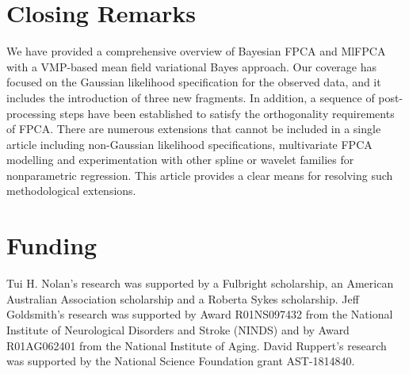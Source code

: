\documentclass[ba]{imsart}
\numberwithin{equation}{section}
\theoremstyle{plain}
\begin{document}

\section{Closing Remarks}
\label{sec:closing_remarks}

We have provided a comprehensive overview of Bayesian FPCA and MlFPCA with a VMP-based mean
field variational Bayes approach. Our coverage has focused on the Gaussian likelihood specification for the observed data,
and it includes the introduction of three new fragments. In addition, a sequence of post-processing steps have
been established to satisfy the orthogonality requirements of FPCA. There are numerous extensions that cannot be included
in a single article including non-Gaussian likelihood specifications, multivariate FPCA modelling and experimentation with
other spline or wavelet families for nonparametric regression. This article provides a clear means for resolving such
methodological extensions.


\section*{Funding}

Tui H. Nolan's research was supported by a Fulbright scholarship, an American Australian Association
scholarship and a Roberta Sykes scholarship. Jeff Goldsmith's research was supported by Award
R01NS097432 from the National Institute of Neurological Disorders and Stroke (NINDS) and by Award
R01AG062401 from the National Institute of Aging. David Ruppert's research was supported by
the National Science Foundation grant AST-1814840.


\begin{supplement}
\end{supplement}

\begin{supplement}
\end{supplement}
\end{document}
